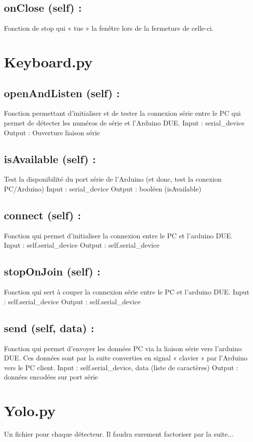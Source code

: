 \subsection{onClose (self) :}
Fonction de stop qui « tue » la fenêtre lors de la fermeture de celle-ci.

\section{Keyboard.py}
\subsection{openAndListen (self) :}
Fonction permettant d’initialiser et de tester la connexion série entre le PC qui permet de détecter les numéros de série et l’Arduino DUE.
Input : serial_device
Output : Ouverture liaison série

\subsection{isAvailable (self) :}
Test la disponibilité du port série de l’Arduino (et donc, test la conexion PC/Arduino)
Input : serial_device
Output : booléen (isAvailable)

\subsection{connect (self) :}
Fonction qui permet d’initialiser la connexion entre le PC et l’arduino DUE.
Input : self.serial_device
Output : self.serial_device

\subsection{stopOnJoin (self) :}
Fonction qui sert à couper la connexion série entre le PC et l’arduino DUE.
Input : self.serial_device
Output : self.serial_device

\subsection{send (self, data) :}
Fonction qui permet d’envoyer les données PC via la liaison série vers l’arduino DUE. Ces données sont par la suite converties en signal « clavier » par l’Arduino vers le PC client.
Input : self.serial_device, data (liste de caractères)
Output : données encodées sur port série

\section{Yolo.py}
Un fichier pour chaque détecteur. Il faudra surement factoriser par la suite...
